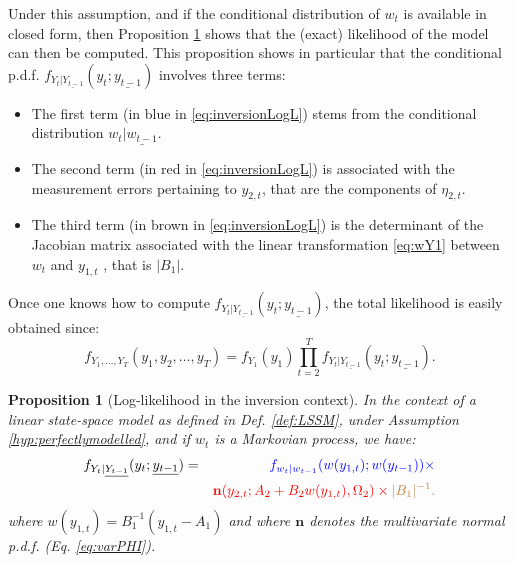 \documentclass[
  12pt,
]{book}
\providecommand{\tightlist}{%
  \setlength{\itemsep}{0pt}\setlength{\parskip}{0pt}}
\newtheorem{proposition}{Proposition}[chapter]
\theoremstyle{definition}
\theoremstyle{definition}
\theoremstyle{definition}
\theoremstyle{definition}
\theoremstyle{remark}
\begin{document}
Under this assumption, and if the conditional distribution of \(w_t\) is available in closed form, then Proposition \ref{prp:logLikinversion} shows that the (exact) likelihood of the model can then be computed. This proposition shows in particular that the conditional p.d.f. \(f_{Y_t|\underline{Y_{t-1}}}(y_t;\underline{y_{t-1}})\) involves three terms:

\begin{itemize}
\tightlist
\item
  The first term (in blue in \eqref{eq:inversionLogL}) stems from the conditional distribution \(w_t|\underline{w_{t-1}}\).
\item
  The second term (in red in \eqref{eq:inversionLogL}) is associated with the measurement errors pertaining to \(y_{2,t}\), that are the components of \(\eta_{2,t}\).
\item
  The third term (in brown in \eqref{eq:inversionLogL}) is the determinant of the Jacobian matrix associated with the linear transformation \eqref{eq:wY1} between \(w_t\) and \(y_{1,t}\) , that is \(|B_1|\).
\end{itemize}

Once one knows how to compute \(f_{Y_t|\underline{Y_{t-1}}}(y_t;\underline{y_{t-1}})\), the total likelihood is easily obtained since:
\[
f_{Y_1,\dots,Y_T}(y_1,y_2,\dots,y_T) = f_{Y_1}(y_1) \prod_{t=2}^T f_{Y_t|\underline{Y_{t-1}}}(y_t;\underline{y_{t-1}}).
\]

\begin{proposition}[Log-likelihood in the inversion context]
\protect\hypertarget{prp:logLikinversion}{}\label{prp:logLikinversion}In the context of a linear state-space model as defined in Def. \ref{def:LSSM}, under Assumption \ref{hyp:perfectlymodelled}, and if \(w_t\) is a Markovian process, we have:
\begin{eqnarray}
f_{Y_t|\underline{Y_{t-1}}}(y_t;\underline{y_{t-1}}) &=& \color{blue}{f_{w_t|w_{t-1}}(w(y_{1,t});w(y_{t-1}))} \times \nonumber\\
&& \color{red}{\mathbf{n}(y_{2,t}; A_2 + B_2w(y_{1,t}),\Omega_2)} \times \color{brown}{|B_1|^{-1}}.\label{eq:inversionLogL}
\end{eqnarray}
where \(w(y_{1,t}) = B_{1}^{-1}(y_{1,t} - A_1)\) and where \(\mathbf{n}\) denotes the multivariate normal p.d.f. (Eq. \eqref{eq:varPHI}).
\end{proposition}
\end{document}
